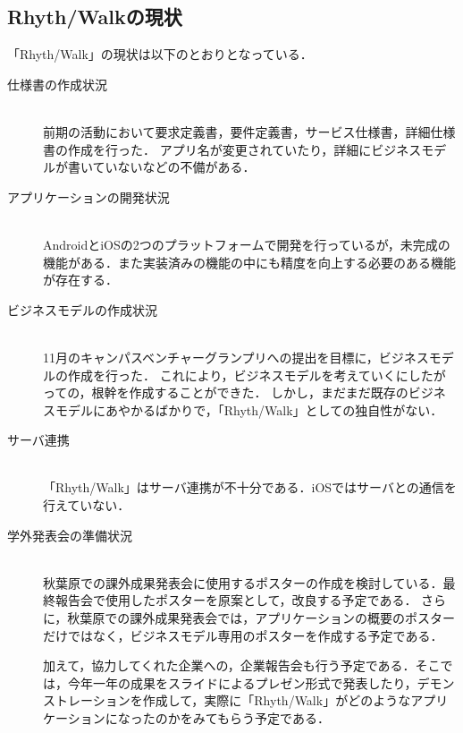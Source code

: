 \subsection{Rhyth/Walkの現状}
「Rhyth/Walk」の現状は以下のとおりとなっている．

\begin{description}

\item[仕様書の作成状況]\mbox{}\\ 
前期の活動において要求定義書，要件定義書，サービス仕様書，詳細仕様書の作成を行った．
アプリ名が変更されていたり，詳細にビジネスモデルが書いていないなどの不備がある．

\item[アプリケーションの開発状況]\mbox{}\\  
AndroidとiOSの2つのプラットフォームで開発を行っているが，未完成の機能がある．また実装済みの機能の中にも精度を向上する必要のある機能が存在する．

\item[ビジネスモデルの作成状況]\mbox{}\\ 
11月のキャンパスベンチャーグランプリへの提出を目標に，ビジネスモデルの作成を行った．
これにより，ビジネスモデルを考えていくにしたがっての，根幹を作成することができた．
しかし，まだまだ既存のビジネスモデルにあやかるばかりで，「Rhyth/Walk」としての独自性がない．

\item[サーバ連携]\mbox{}\\
「Rhyth/Walk」はサーバ連携が不十分である．iOSではサーバとの通信を行えていない．

\item[学外発表会の準備状況]\mbox{}\\ 
秋葉原での課外成果発表会に使用するポスターの作成を検討している．最終報告会で使用したポスターを原案として，改良する予定である．
さらに，秋葉原での課外成果発表会では，アプリケーションの概要のポスターだけではなく，ビジネスモデル専用のポスターを作成する予定である．
\par
加えて，協力してくれた企業への，企業報告会も行う予定である．そこでは，今年一年の成果をスライドによるプレゼン形式で発表したり，デモンストレーションを作成して，実際に「Rhyth/Walk」がどのようなアプリケーションになったのかをみてもらう予定である．

\end{description}
